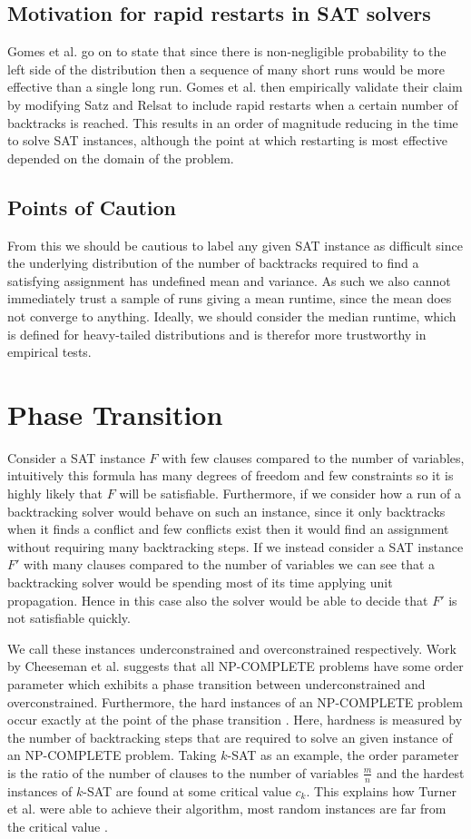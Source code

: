 \subsection{Motivation for rapid restarts in SAT solvers}
Gomes et al. go on to state that since there is non-negligible probability to the left
side of the distribution then a sequence of many short runs would be more effective than
a single long run. Gomes et al. then empirically validate their claim by modifying Satz and Relsat
to include rapid restarts when a certain number of backtracks is reached.
This results in an order of
magnitude reducing in the time to solve SAT instances,
although the point at which restarting is most
effective depended on the domain of the problem.

\subsection{Points of Caution}
From this we should be cautious to label any given SAT instance as difficult since
the underlying distribution of the number of backtracks required to find a satisfying
assignment has undefined mean and variance. As such we also cannot immediately trust a
sample of runs giving a mean runtime, since the mean does not converge to anything.
Ideally, we should consider the median runtime, which is defined for heavy-tailed distributions
and is therefor more trustworthy in empirical tests.

\section{Phase Transition}
Consider a SAT instance $F$ with few clauses compared to the number of variables,
intuitively this formula has many degrees of freedom and few constraints so
it is highly likely that $F$ will be satisfiable. Furthermore, if we consider
how a run of a backtracking solver would behave on such an instance, since it
only backtracks when it finds a conflict and few conflicts exist then it would
find an assignment without requiring many backtracking steps. If we instead
consider a SAT instance $F'$ with many clauses compared to the number of variables
we can see that a backtracking solver would be spending most of its time applying
unit propagation. Hence in this case also the solver would be able to decide
that $F'$ is not satisfiable quickly.

We call these instances underconstrained and overconstrained respectively.
Work by Cheeseman et al. suggests that all NP-COMPLETE problems have some
order parameter which exhibits a phase transition between underconstrained and 
overconstrained. Furthermore, the hard instances of an NP-COMPLETE problem
occur exactly at the point of the phase transition \cite{cheeseman1991really}.
Here, hardness is measured by the number of backtracking steps that are required
to solve an given instance of an NP-COMPLETE problem. Taking $k$-SAT as an example,
the order parameter is the ratio of the number of clauses to the number of variables
$\frac{m}{n}$ and the hardest instances of $k$-SAT are found at some critical value
$c_k$. This explains how Turner et al. were able to achieve their algorithm,
most random instances are far from the critical value \cite{turner1988almost}.

